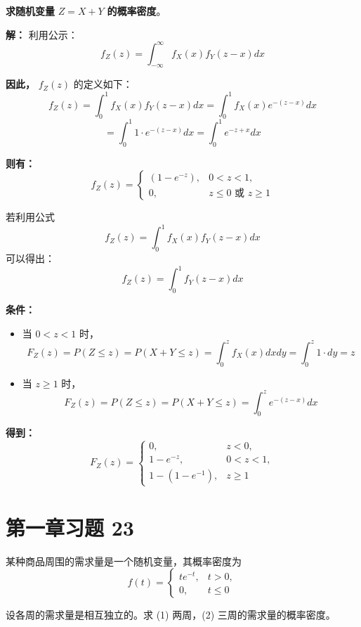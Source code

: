 \documentclass[twoside]{article}
\begin{document}
\textbf{求随机变量} $Z = X + Y$ \textbf{的概率密度}。

\begin{ans}{22}{22}

    \textbf{解：} 利用公示：
\[
f_{Z}(z) = \int_{-\infty}^{\infty} f_X(x) f_Y(z - x) dx
\]

\textbf{因此，} $f_{Z}(z)$ 的定义如下：
\[
f_Z(z) = \int_{0}^{1} f_X(x) f_Y(z - x) dx = \int_{0}^{1} f_X(x) e^{-(z-x)} dx
\]
\[
= \int_{0}^{1} 1 \cdot e^{-(z-x)} dx = \int_{0}^{1} e^{-z+x} dx
\]

\textbf{则有：}
\[
f_Z(z) = 
\begin{cases} 
\left(1 - e^{-z}\right), & 0 < z < 1, \\ 
0, & z \leq 0 \text{ 或 } z \geq 1 
\end{cases}
\]

若利用公式
\[
f_Z(z) = \int_{0}^{1} f_X(x) f_Y(z - x) dx
\]
可以得出：
\[
f_Z(z) = \int_{0}^{1} f_Y(z-x)dx
\]

\textbf{条件：}
\begin{itemize}
    \item 当 $0 < z < 1$ 时，
    \[
    F_Z(z) = P(Z \leq z) = P(X + Y \leq z) = \int_{0}^{z} f_X(x)dxdy = \int_{0}^{z} 1 \cdot dy = z
    \]
    
    \item 当 $z \geq 1$ 时，
    \[
    F_Z(z) = P(Z \leq z) = P(X + Y \leq z) = \int_{0}^{z} e^{-(z-x)}dx
    \]
\end{itemize}

\textbf{得到：}
\[
F_Z(z) = 
\begin{cases} 
0, & z < 0, \\ 
1 - e^{-z}, & 0 < z < 1, \\ 
1 - (1 - e^{-1}), & z \geq 1 
\end{cases}
\]

\end{ans}

\section{第一章习题 23}

某种商品周围的需求量是一个随机变量，其概率密度为
\[
f(t) = 
\begin{cases} 
te^{-t}, & t > 0, \\ 
0, & t \leq 0 
\end{cases}
\]

设各周的需求量是相互独立的。求 (1) 两周，(2) 三周的需求量的概率密度。
\end{document}
